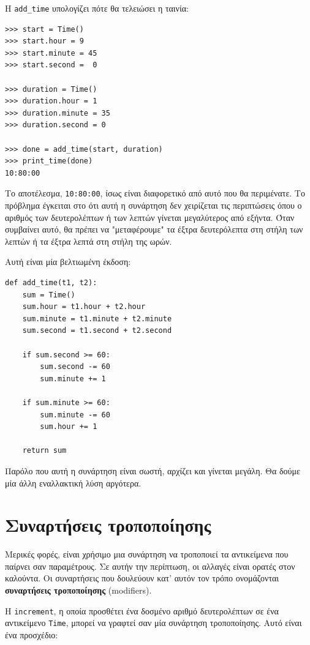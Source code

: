 \documentclass[10pt]{book}
\begin{document}
Η \verb"add_time" υπολογίζει πότε θα τελειώσει η ταινία:

\begin{verbatim}
>>> start = Time()
>>> start.hour = 9
>>> start.minute = 45
>>> start.second =  0

>>> duration = Time()
>>> duration.hour = 1
>>> duration.minute = 35
>>> duration.second = 0

>>> done = add_time(start, duration)
>>> print_time(done)
10:80:00
\end{verbatim}
%
Το αποτέλεσμα, {\tt 10:80:00}, ίσως είναι διαφορετικό από αυτό που θα περιμένατε. Το πρόβλημα έγκειται στο ότι
αυτή η συνάρτηση δεν χειρίζεται τις περιπτώσεις όπου ο αριθμός των δευτερολέπτων ή των λεπτών γίνεται μεγαλύτερος
από εξήντα. Όταν συμβαίνει αυτό, θα πρέπει να "μεταφέρουμε" τα έξτρα δευτερόλεπτα στη στήλη των λεπτών ή τα έξτρα λεπτά στη στήλη της ωρών.

Αυτή είναι μία βελτιωμένη έκδοση:

\begin{verbatim}
def add_time(t1, t2):
    sum = Time()
    sum.hour = t1.hour + t2.hour
    sum.minute = t1.minute + t2.minute
    sum.second = t1.second + t2.second

    if sum.second >= 60:
        sum.second -= 60
        sum.minute += 1

    if sum.minute >= 60:
        sum.minute -= 60
        sum.hour += 1

    return sum
\end{verbatim}
%
Παρόλο που αυτή η συνάρτηση είναι σωστή, αρχίζει και γίνεται μεγάλη. Θα δούμε μία άλλη εναλλακτική λύση
αργότερα.



\section{Συναρτήσεις τροποποίησης}
\label{increment}

Μερικές φορές, είναι χρήσιμο μια συνάρτηση να τροποποιεί τα αντικείμενα που παίρνει σαν παραμέτρους.
Σε αυτήν την περίπτωση, οι αλλαγές είναι ορατές στον καλούντα. Οι συναρτήσεις που δουλεύουν κατ' αυτόν τον
τρόπο ονομάζονται {\bf συναρτήσεις τροποποίησης} (modifiers).

Η {\tt increment}, η οποία προσθέτει ένα δοσμένο αριθμό δευτερολέπτων σε ένα αντικείμενο 
{\tt Time}, μπορεί να γραφτεί σαν μία συνάρτηση τροποποίησης. Αυτό είναι ένα προσχέδιο:
\end{document}

